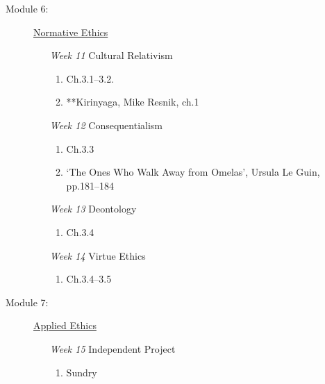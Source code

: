 \documentclass[article,oneside]{memoir}
\begin{document}
\begin{description}
\item[Module 6:] \href{http://scoconno.github.io/Teaching/Examined/Ethics/}{Normative Ethics}
\begin{enumerate}

\item[\textit{Week 11}] Cultural Relativism
\begin{enumerate}
\item Ch.3.1--3.2.
\item **Kirinyaga, Mike Resnik, ch.1
\end{enumerate}
\item[\textit{Week 12}]  Consequentialism 
\begin{enumerate}
\item Ch.3.3
\item  `The Ones Who Walk Away from Omelas', Ursula Le Guin, pp.181--184 
\end{enumerate}
\item[\textit{Week 13}]  Deontology
\begin{enumerate}
\item Ch.3.4
\end{enumerate}

\item[\textit{Week 14}] Virtue Ethics
\begin{enumerate}
\item Ch.3.4--3.5
\end{enumerate}
\end{enumerate}

\item[Module 7:] \href{http://scoconno.github.io/Teaching/Examined/Applied/}{Applied Ethics}
\begin{enumerate}

\item[\textit{Week 15}] Independent Project
\begin{enumerate}
\item Sundry
\end{enumerate}
\end{enumerate}

\end{description}
\end{document}

